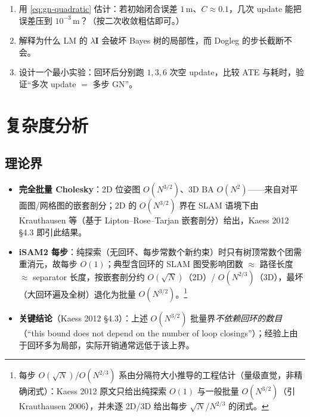 \begin{practice}
\begin{enumerate}
  \item 用 \cref{eq:gn-quadratic} 估计：若初始闭合误差 $1$\,m、$C\approx 0.1$，几次 update 能把误差压到 $10^{-3}$\,m？（按二次收敛粗估即可。）
  \item 解释为什么 LM 的 $\lambda\mathbf{I}$ 会破坏 Bayes 树的局部性，而 Dogleg 的步长截断不会。
  \item 设计一个最小实验：回环后分别跑 $1,3,6$ 次空 update，比较 ATE 与耗时，验证“多次 update $=$ 多步 GN”。
\end{enumerate}
\end{practice}

\section{复杂度分析}
\label{sec:isam-complexity}

\subsection{理论界}
\label{sec:isam-bounds}

\begin{itemize}
  \item \textbf{完全批量 Cholesky}：2D 位姿图 $O(N^{3/2})$、3D BA $O(N^2)$——来自对平面图/网格图的嵌套剖分；2D 的 $O(N^{3/2})$ 界在 SLAM 语境下由 Krauthausen 等\cite{krauthausen2006exploiting}（基于 Lipton--Rose--Tarjan 嵌套剖分\cite{lipton1979generalized}）给出，Kaess 2012 §4.3\cite{kaess2012isam2} 即引此结果。
  \item \textbf{iSAM2 每步}：纯探索（无回环、每步常数个新约束）时只有树顶常数个团需重消元，故每步 $O(1)$\cite{kaess2012isam2}；典型含回环的 SLAM 图受影响团数 $\approx$ 路径长度 $\approx$ separator 长度，按嵌套剖分约 $O(\sqrt N)$（2D）/ $O(N^{2/3})$（3D），最坏（大回环遍及全树）退化为批量 $O(N^{3/2})$。\footnote{每步 $O(\sqrt N)$/$O(N^{2/3})$ 系由分隔符大小推导的工程估计（量级直觉，非精确闭式）：Kaess 2012 原文只给出纯探索 $O(1)$ 与一般批量 $O(N^{3/2})$（引 Krauthausen 2006），并未逐 2D/3D 给出每步 $\sqrt N$/$N^{2/3}$ 的闭式。}
  \item \textbf{关键结论}（Kaess 2012 §4.3\cite{kaess2012isam2}）：上述 $O(N^{3/2})$ 批量界\emph{不依赖回环的数目}（“this bound does not depend on the number of loop closings”）；经验上由于回环多为局部，实际开销通常远低于该上界。
\end{itemize}

